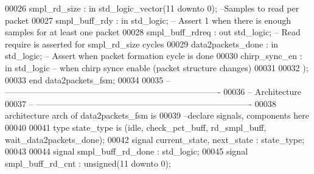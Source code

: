 \begin{DoxyCode}
00026       \textcolor{vhdlchar}{smpl_rd_size}      \textcolor{vhdlchar}{:} \textcolor{keywordflow}{in} \textcolor{comment}{std\_logic\_vector}\textcolor{vhdlchar}{(}\textcolor{vhdllogic}{}\textcolor{vhdllogic}{11} \textcolor{keywordflow}{downto} \textcolor{vhdllogic}{}\textcolor{vhdllogic}{0}\textcolor{vhdlchar}{)};\textcolor{keyword}{ --Samples to read per packet}
00027       \textcolor{vhdlchar}{smpl_buff_rdy}     \textcolor{vhdlchar}{:} \textcolor{keywordflow}{in} \textcolor{comment}{std\_logic};\textcolor{keyword}{   -- Assert 1 when there is enough samples for at least one packet}
00028       \textcolor{vhdlchar}{smpl_buff_rdreq}   \textcolor{vhdlchar}{:} \textcolor{keywordflow}{out} \textcolor{comment}{std\_logic};\textcolor{keyword}{  -- Read require is asserted for smpl\_rd\_size cycles}
00029       \textcolor{vhdlchar}{data2packets_done} \textcolor{vhdlchar}{:} \textcolor{keywordflow}{in} \textcolor{comment}{std\_logic};\textcolor{keyword}{   -- Assert when packet formation cycle is done}
00030         \textcolor{vhdlchar}{chirp_sync_en}       \textcolor{vhdlchar}{:} \textcolor{keywordflow}{in} \textcolor{comment}{std\_logic}\textcolor{keyword}{    -- when chirp synce enable (packet structure changes)}
00031     
00032         \textcolor{vhdlchar}{)};
00033 \textcolor{keywordflow}{end} \textcolor{vhdlchar}{data2packets\_fsm};
00034 
00035 \textcolor{keyword}{-- ----------------------------------------------------------------------------}
00036 \textcolor{keyword}{-- Architecture}
00037 \textcolor{keyword}{-- ----------------------------------------------------------------------------}
00038 \textcolor{keywordflow}{architecture} arch \textcolor{keywordflow}{of} data2packets_fsm is
00039 \textcolor{keyword}{--declare signals,  components here}
00040 
00041 \textcolor{keywordflow}{type} \textcolor{vhdlchar}{state_type} \textcolor{keywordflow}{is} \textcolor{vhdlchar}{(}\textcolor{vhdlchar}{idle}\textcolor{vhdlchar}{,} \textcolor{vhdlchar}{check\_pct\_buff}\textcolor{vhdlchar}{,} \textcolor{vhdlchar}{rd\_smpl\_buff}\textcolor{vhdlchar}{,} \textcolor{vhdlchar}{wait\_data2packets\_done}\textcolor{vhdlchar}{)};
00042 \textcolor{keywordflow}{signal} \textcolor{vhdlchar}{current_state}\textcolor{vhdlchar}{,} \textcolor{vhdlchar}{next_state} \textcolor{vhdlchar}{:} \textcolor{vhdlchar}{state_type};
00043 
00044 \textcolor{keywordflow}{signal} \textcolor{vhdlchar}{smpl_buff_rd_done}         \textcolor{vhdlchar}{:} \textcolor{comment}{std\_logic};
00045 \textcolor{keywordflow}{signal} \textcolor{vhdlchar}{smpl_buff_rd_cnt}          \textcolor{vhdlchar}{:} \textcolor{comment}{unsigned}\textcolor{vhdlchar}{(}\textcolor{vhdllogic}{}\textcolor{vhdllogic}{11} \textcolor{keywordflow}{downto} \textcolor{vhdllogic}{}\textcolor{vhdllogic}{0}\textcolor{vhdlchar}{)};

\end{DoxyCode}
